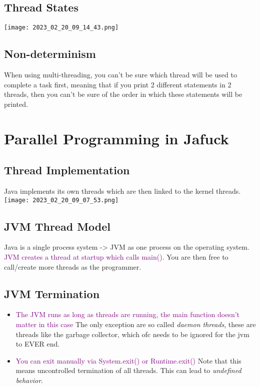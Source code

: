 \documentclass[main.tex,fontsize=8pt,paper=a4,paper=portrait,DIV=calc,]{scrartcl}
\begin{document}
\subsection{Thread States}
\texttt{[image: 2023\_02\_20\_09\_14\_43.png]}

\subsection{Non-determinism}
When using multi-threading, you can't be sure which thread will be used to complete a task first, meaning that if you print 2 different statements in 2 threads, then you can't be sure of the order in which these statements will be printed.

\section{Parallel Programming in Jafuck}
\subsection{Thread Implementation}
Java implements its own threads which are then linked to the kernel threads.\newline
\texttt{[image: 2023\_02\_20\_09\_07\_53.png]}

\subsection{JVM Thread Model}
Java is a single process system -> JVM as one process on the operating system. \newline
\textcolor{purple}{JVM creates a thread at startup which calls main().}\newline
You are then free to call/create more threads as the programmer.

\subsection{JVM Termination}
\begin{itemize}
\item \textcolor{purple}{The JVM runs as long as threads are running, the main function doesn't matter in this case}\newline
  The only exception are so called \emph{daemon threads}, these are threads like the garbage collector, which ofc needs to be ignored for the jvm to EVER end.
\item \textcolor{purple}{You can exit manually via System.exit() or Runtime.exit()}\newline
  Note that this means uncontrolled termination of all threads.
  This can lead to \emph{undefined behavior}.
\end{itemize} 
\end{document}
